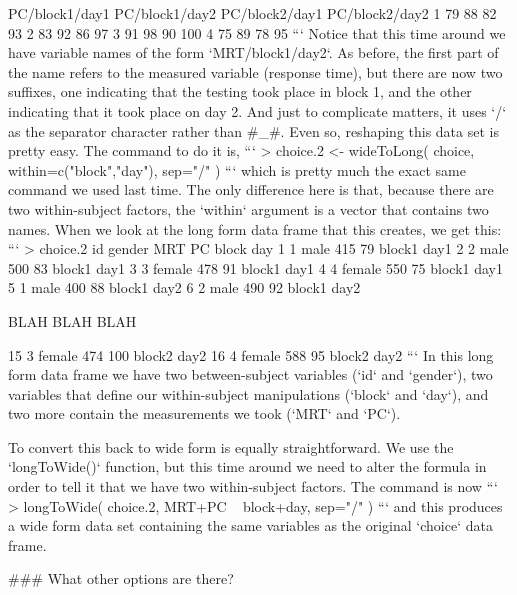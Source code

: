   PC/block1/day1 PC/block1/day2 PC/block2/day1 PC/block2/day2
1             79             88             82             93
2             83             92             86             97
3             91             98             90            100
4             75             89             78             95
```
Notice that this time around we have variable names of the form `MRT/block1/day2`. As before, the first part of the name refers to the measured variable (response time), but there are now two suffixes, one indicating that the testing took place in block 1, and the other indicating that it took place on day 2. And just to complicate matters, it uses `/` as the separator character rather than \rtextverb#_#. Even so, reshaping this data set is pretty easy. The command to do it is,
```
> choice.2 <- wideToLong( choice, within=c("block","day"), sep="/" )
```
which is pretty much the exact same command we used last time. The only difference here is that, because there are two within-subject factors, the `within` argument is a vector that contains two names. When we look at the long form data frame that this creates, we get this:
```
> choice.2
   id gender MRT  PC  block  day
1   1   male 415  79 block1 day1
2   2   male 500  83 block1 day1
3   3 female 478  91 block1 day1
4   4 female 550  75 block1 day1
5   1   male 400  88 block1 day2
6   2   male 490  92 block1 day2

BLAH BLAH BLAH

15  3 female 474 100 block2 day2
16  4 female 588  95 block2 day2
```
In this long form data frame we have two between-subject variables (`id` and `gender`), two variables that define our within-subject manipulations (`block` and `day`), and two more contain the measurements we took (`MRT` and `PC`). 

To convert this back to wide form is equally straightforward. We use the `longToWide()` function, but this time around we need to alter the formula in order to tell it that we have two within-subject factors. The command is now
```
> longToWide( choice.2, MRT+PC ~ block+day, sep="/" ) 
```
and this produces a wide form data set containing the same variables as the original `choice` data frame. 


### What other options are there?

